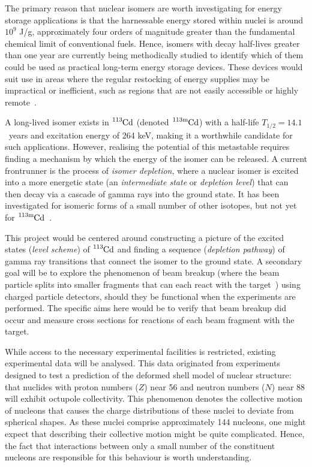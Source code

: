 \documentclass[12pt,a4paper]{article}
\newcommand{\cdm}{\ce{^{113\text{m}}Cd}}
\begin{document}
\medskip
\noindent
The primary reason that nuclear isomers are worth investigating for energy storage applications is that the harnessable energy stored within nuclei is around $10^9$ J/g, approximately four orders of magnitude greater than the fundamental chemical limit of conventional fuels.
Hence, isomers with decay half-lives greater than one year are currently being methodically studied to identify which of them could be used as practical long-term energy storage devices.
These devices would suit use in areas where the regular restocking of energy supplies may be impractical or inefficient, such as regions that are not easily accessible or highly remote~\cite{shaffer_innovations_2018}.

\medskip
\noindent
A long-lived isomer exists in $\ce{^{113}Cd}$ (denoted $\cdm$) with a half-life $T_{1/2} = 14.1$~years and excitation energy of 264 keV, making it a worthwhile candidate for such applications.
However, realising the potential of this metastable requires finding a mechanism by which the energy of the isomer can be released.
A current frontrunner is the process of \textit{isomer depletion}, where a nuclear isomer is excited into a more energetic state (an \textit{intermediate state} or \textit{depletion level}) that can then decay via a cascade of gamma rays into the ground state.
It has been investigated for isomeric forms of a small number of other isotopes, but not yet for $\cdm$~\cite{shaffer_innovations_2018}.

\medskip
\noindent
This project would be centered around constructing a picture of the excited states (\textit{level scheme}) of $\ce{^{113}Cd}$ and finding a sequence (\textit{depletion pathway}) of gamma ray transitions that connect the isomer to the ground state.
A secondary goal will be to explore the phenomenon of beam breakup (where the beam particle splits into smaller fragments that can each react with the target~\cite{curtis_+li_2005,dasgupta_fusion_1999}) using charged particle detectors, should they be functional when the experiments are performed.
The specific aims here would be to verify that beam breakup did occur and measure cross sections for reactions of each beam fragment with the target.


\medskip
\noindent
While access to the necessary experimental facilities is restricted, existing experimental data will be analysed.
This data originated from experiments designed to test a prediction of the deformed shell model of nuclear structure: that nuclides with proton numbers ($Z$) near 56 and neutron numbers ($N$) near 88 will exhibit octupole collectivity.
This phenomenon denotes the collective motion of nucleons that causes the charge distributions of these nuclei to deviate from spherical shapes.
As these nuclei comprise approximately 144 nucleons, one might expect that describing their collective motion might be quite complicated.
Hence, the fact that interactions between only a small number of the constituent nucleons are responsible for this behaviour is worth understanding.
\end{document}
